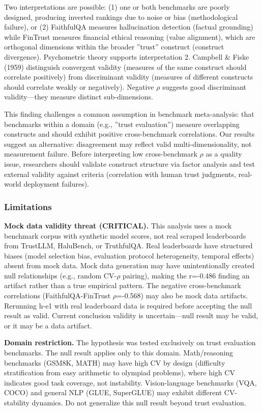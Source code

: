 Two interpretations are possible: (1) one or both benchmarks are poorly designed, producing inverted rankings due to noise or bias (methodological failure), or (2) FaithfulQA measures hallucination detection (factual grounding) while FinTrust measures financial ethical reasoning (value alignment), which are orthogonal dimensions within the broader ''trust'' construct (construct divergence). Psychometric theory supports interpretation 2. Campbell \& Fiske (1959) distinguish convergent validity (measures of the same construct should correlate positively) from discriminant validity (measures of different constructs should correlate weakly or negatively). Negative $\rho$ suggests good discriminant validity---they measure distinct sub-dimensions.

This finding challenges a common assumption in benchmark meta-analysis: that benchmarks within a domain (e.g., ''trust evaluation'') measure overlapping constructs and should exhibit positive cross-benchmark correlations. Our results suggest an alternative: disagreement may reflect valid multi-dimensionality, not measurement failure. Before interpreting low cross-benchmark $\rho$ as a quality issue, researchers should validate construct structure via factor analysis and test external validity against criteria (correlation with human trust judgments, real-world deployment failures).

\subsubsection{Limitations}

\textbf{Mock data validity threat (CRITICAL).} This analysis uses a mock benchmark corpus with synthetic model scores, not real scraped leaderboards from TrustLLM, HaluBench, or TruthfulQA. Real leaderboards have structured biases (model selection bias, evaluation protocol heterogeneity, temporal effects) absent from mock data. Mock data generation may have unintentionally created null relationships (e.g., random CV-$\rho$ pairing), making the r=-0.486 finding an artifact rather than a true empirical pattern. The negative cross-benchmark correlations (FaithfulQA-FinTrust $\rho$=-0.568) may also be mock data artifacts. Rerunning h-e1 with real leaderboard data is required before accepting the null result as valid. Current conclusion validity is uncertain---null result may be valid, or it may be a data artifact.

\textbf{Domain restriction.} The hypothesis was tested exclusively on trust evaluation benchmarks. The null result applies only to this domain. Math/reasoning benchmarks (GSM8K, MATH) may have high CV by design (difficulty stratification from easy arithmetic to olympiad problems), where high CV indicates good task coverage, not instability. Vision-language benchmarks (VQA, COCO) and general NLP (GLUE, SuperGLUE) may exhibit different CV-stability dynamics. Do not generalize this null result beyond trust evaluation.


